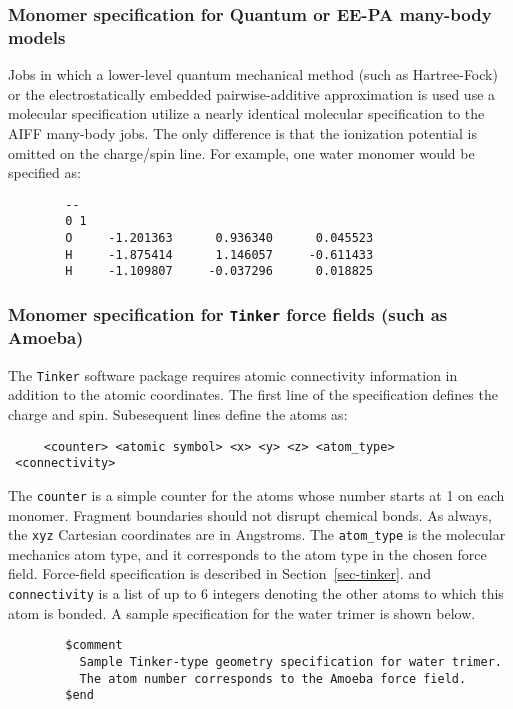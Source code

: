 \documentclass[11pt,letterpaper]{article}
\begin{document}
\begin{spacing}{1.0}
\subsubsection{Monomer specification for Quantum or EE-PA many-body models}
Jobs in which a lower-level quantum mechanical method (such as Hartree-Fock)
or the electrostatically embedded pairwise-additive approximation is used
use a molecular specification utilize a nearly identical molecular specification
to the AIFF many-body jobs.  The only difference is that the ionization
potential is omitted on the charge/spin line.  For example, one water
monomer would be specified as:
\vspace{5mm}
\hrulefill
\begin{verbatim}
        --
        0 1
        O     -1.201363      0.936340      0.045523
        H     -1.875414      1.146057     -0.611433
        H     -1.109807     -0.037296      0.018825
\end{verbatim}
\hrulefill



\subsubsection{Monomer specification for {\tt Tinker} force fields (such as Amoeba)}
The {\tt Tinker} software package requires atomic connectivity
information in addition to the atomic coordinates.  The first line of the
specification defines the charge and spin.  Subesequent lines define the
atoms as:
\begin{verbatim}
     <counter> <atomic symbol> <x> <y> <z> <atom_type>
 <connectivity>
\end{verbatim}
The {\tt counter} is a simple counter for the atoms whose number
starts at 1 on each monomer.  Fragment boundaries should not disrupt
chemical bonds.  As always, the {\tt xyz} Cartesian coordinates are in
Angstroms.  The {\tt atom\_type} is the molecular mechanics atom type,
and it corresponds to the atom type in the chosen force field.  Force-field
specification is described in Section~\ref{sec-tinker}.
and {\tt connectivity} is a list of up to 6 integers denoting the
other atoms to which this atom is bonded.  A sample specification for
the water trimer is shown below.

\vspace{5mm}
\hrulefill
\begin{verbatim}
        $comment
          Sample Tinker-type geometry specification for water trimer.
          The atom number corresponds to the Amoeba force field.
        $end


\end{verbatim}
\end{spacing}
\end{document}
